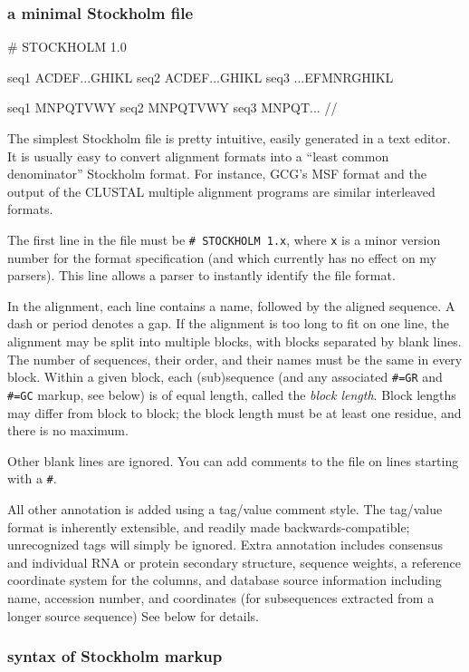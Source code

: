 \subsubsection{a minimal Stockholm file}
\begin{sreoutput}
# STOCKHOLM 1.0

seq1  ACDEF...GHIKL
seq2  ACDEF...GHIKL
seq3  ...EFMNRGHIKL

seq1  MNPQTVWY
seq2  MNPQTVWY
seq3  MNPQT...
//
\end{sreoutput}

The simplest Stockholm file is pretty intuitive, easily generated in a
text editor. It is usually easy to convert alignment formats into a
``least common denominator'' Stockholm format. For instance, GCG's MSF
format and the output of the CLUSTAL multiple alignment programs are
similar interleaved formats.

The first line in the file must be \verb+# STOCKHOLM 1.x+, where
\verb+x+ is a minor version number for the format specification
(and which currently has no effect on my parsers). This line allows a
parser to instantly identify the file format.

In the alignment, each line contains a name, followed by the aligned
sequence. A dash or period denotes a gap. If the alignment is too long
to fit on one line, the alignment may be split into multiple blocks,
with blocks separated by blank lines. The number of sequences, their
order, and their names must be the same in every block. Within a given
block, each (sub)sequence (and any associated \verb+#=GR+ and
\verb+#=GC+ markup, see below) is of equal length, called the
\textit{block length}. Block lengths may differ from block to block;
the block length must be at least one residue, and there is no
maximum.  

Other blank lines are ignored. You can add comments to the file on
lines starting with a \verb+#+.

All other annotation is added using a tag/value comment style. The
tag/value format is inherently extensible, and readily made
backwards-compatible; unrecognized tags will simply be ignored. Extra
annotation includes consensus and individual RNA or protein secondary
structure, sequence weights, a reference coordinate system for the
columns, and database source information including name, accession
number, and coordinates (for subsequences extracted from a longer
source sequence) See below for details.

\subsubsection{syntax of Stockholm markup}

